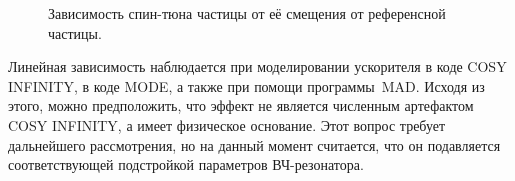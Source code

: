 \begin{figure}[H]\centering
	\caption{Зависимость спин-тюна частицы от её смещения от референсной частицы.\label{fig:decoh:perfect}}
\end{figure}

Линейная зависимость наблюдается при моделировании ускорителя в коде COSY INFINITY, в коде MODE, 
а также при помощи программы MAD. 
Исходя из этого, можно предположить, что эффект не является численным артефактом COSY INFINITY,
а имеет физическое основание. Этот вопрос требует дальнейшего рассмотрения, 
но на данный момент считается, что он подавляется соответствующей подстройкой 
параметров ВЧ-резонатора.~\cite[стр.~210,~219]{Eremey:Thesis}

